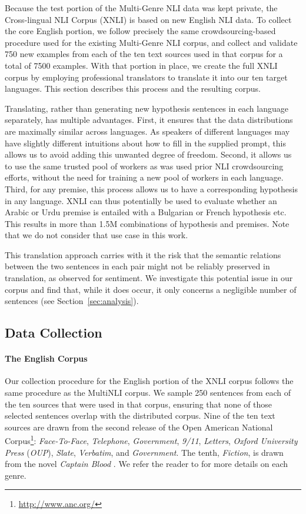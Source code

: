 \documentclass[11pt,a4paper]{article}
\begin{document}
Because the test portion of the Multi-Genre NLI data was kept private, the Cross-lingual NLI Corpus (XNLI) is based on new English NLI data. To collect the core English portion, we follow precisely the same crowdsourcing-based procedure used for the existing Multi-Genre NLI corpus, and collect and validate 750 new examples from each of the ten text sources used in that corpus for a total of 7500 examples. With that portion in place, we create the full XNLI corpus by employing professional translators to translate it into our ten target languages. This section describes this process and the resulting corpus. 

Translating, rather than generating new hypothesis sentences in each language separately, has multiple advantages. First, it ensures that the data distributions are maximally similar across languages. As speakers of different languages may have slightly different intuitions about how to fill in the supplied prompt, this allows us to avoid adding this unwanted degree of freedom. Second, it allows us to use the same trusted pool of workers as was used prior NLI crowdsourcing efforts, without the need for training a new pool of workers in each language. Third, for any premise, this process allows us to have a corresponding hypothesis in any language. XNLI can thus potentially be used to evaluate whether an Arabic or Urdu premise is entailed with a Bulgarian or French hypothesis etc. This results in more than 1.5M combinations of hypothesis and premises. Note that we do not consider that use case in this work.

This translation approach carries with it the risk that the semantic relations between the two sentences in each pair might not be reliably preserved in translation, as \citet{Mohammad:2016} observed for sentiment. We investigate this potential issue in our corpus and find that, while it does occur, it only concerns a negligible number of sentences (see Section~\ref{sec:analysis}).

\subsection{Data Collection}

\paragraph{The English Corpus}

Our collection procedure for the English portion of the XNLI corpus follows the same procedure as the MultiNLI corpus. We sample 250 sentences from each of the ten sources that were used in that corpus, ensuring that none of those selected sentences overlap with the distributed corpus. Nine of the ten text sources are drawn from the second release of the Open American National Corpus\footnote{\url{http://www.anc.org/}}: \textit{Face-To-Face}, \textit{Telephone}, \textit{Government}, \textit{9/11}, \textit{Letters}, \textit{Oxford University Press} (\textit{OUP}), \textit{Slate}, \textit{Verbatim}, and \textit{Government}. The tenth, \textit{Fiction}, is drawn from the novel {\it Captain Blood} \cite{CaptainBlood}. We refer the reader to \citet{multinli:2017} for more details on each genre.
\end{document}
